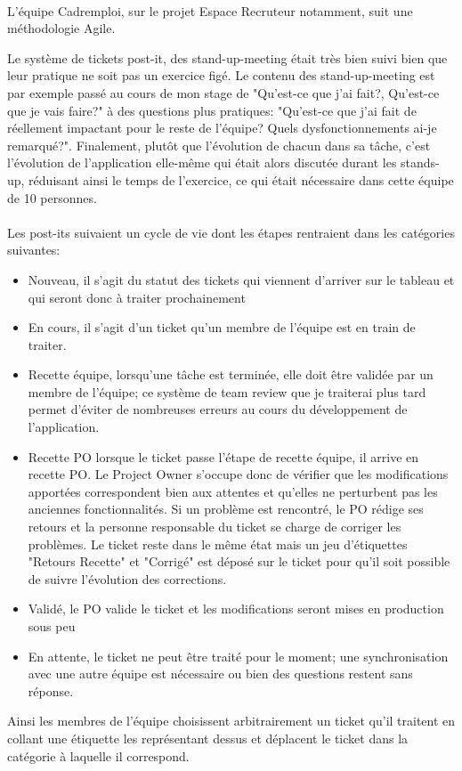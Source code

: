 \paragraph{}
L'équipe Cadremploi, sur le projet Espace Recruteur notamment, suit une méthodologie Agile.

Le système de tickets post-it, des stand-up-meeting était très bien suivi bien que leur pratique ne soit pas un exercice figé.
Le contenu des stand-up-meeting est par exemple passé au cours de mon stage de "Qu'est-ce que j'ai fait?, Qu'est-ce que je vais faire?" à des questions plus pratiques: "Qu'est-ce que j'ai fait de réellement impactant pour le reste de l'équipe? Quels dysfonctionnements ai-je remarqué?".
Finalement, plutôt que l'évolution de chacun dans sa tâche, c'est l'évolution de l'application elle-même qui était alors discutée durant les stands-up, réduisant ainsi le temps de l'exercice, ce qui était nécessaire dans cette équipe de 10 personnes.
\paragraph{}
Les post-its suivaient un cycle de vie dont les étapes rentraient dans les catégories suivantes:
\begin{itemize}
  \item{Nouveau}, il s'agit du statut des tickets qui viennent d'arriver sur le tableau et qui seront donc à traiter prochainement
  \item{En cours}, il s'agit d'un ticket qu'un membre de l'équipe est en train de traiter.
  \item{Recette équipe}, lorsqu'une tâche est terminée, elle doit être validée par un membre de l'équipe; ce système de team review que je traiterai plus tard permet d'éviter de nombreuses erreurs au cours du développement de l'application.
  \item{Recette PO} lorsque le ticket passe l'étape de recette équipe, il arrive en recette PO.
  Le Project Owner s'occupe donc de vérifier que les modifications apportées correspondent bien aux attentes et qu'elles ne perturbent pas les anciennes fonctionnalités.
  Si un problème est rencontré, le PO rédige ses retours et la personne responsable du ticket se charge de corriger les problèmes.
  Le ticket reste dans le même état mais un jeu d'étiquettes "Retours Recette" et "Corrigé" est déposé sur le ticket pour qu'il soit possible de suivre l'évolution des corrections.
  \item{Validé}, le PO valide le ticket et les modifications seront mises en production sous peu
  \item{En attente}, le ticket ne peut être traité pour le moment; une synchronisation avec une autre équipe est nécessaire ou bien des questions restent sans réponse.
\end{itemize}
Ainsi les membres de l'équipe choisissent arbitrairement un ticket qu'il traitent en collant une étiquette les représentant dessus et déplacent le ticket dans la catégorie à laquelle il correspond.
